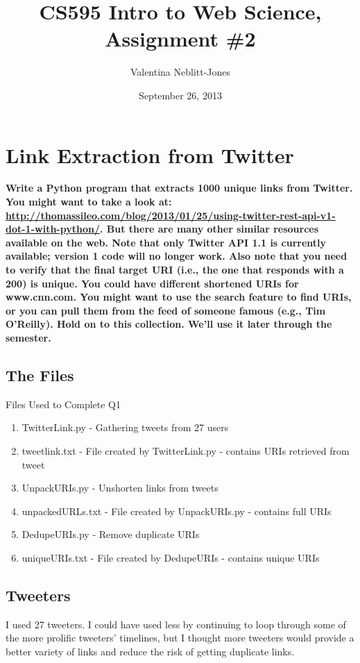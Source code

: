 \documentclass{article}
\begin{document}
\title{CS595 Intro to Web Science, Assignment \#2}
\author{Valentina Neblitt-Jones}
\date{September 26, 2013}
\maketitle

\section{Link Extraction from Twitter}
\textbf {Write a Python program that extracts 1000 unique links from Twitter. You might want to take a look at: \url{http://thomassileo.com/blog/2013/01/25/using-twitter-rest-api-v1-dot-1-with-python/}. But there are many other similar resources available on the web. Note that only Twitter API 1.1 is currently available; version 1 code will no longer work. Also note that you need to verify that the final target URI (i.e., the one that responds with a 200) is unique. You could have different shortened URIs for www.cnn.com. You might want to use the search feature to find URIs, or you can pull them from the feed of someone famous (e.g., Tim O'Reilly). Hold on to this collection. We'll use it later through the semester.}


\subsection*{The Files}
Files Used to Complete Q1

\begin{enumerate}
\item TwitterLink.py - Gathering tweets from 27 users
\item tweetlink.txt - File created by TwitterLink.py - contains URIs retrieved from tweet
\item UnpackURIs.py - Unshorten links from tweets
\item unpackedURLs.txt - File created by UnpackURIs.py - contains full URIs
\item DedupeURIs.py - Remove duplicate URIs
\item uniqueURIs.txt - File created by DedupeURIs - contains unique URIs
\end{enumerate}

\subsection*{Tweeters}
I used 27 tweeters. I could have used less by continuing to loop through some of the more prolific tweeters' timelines, but I thought more tweeters would provide a better variety of links and reduce the risk of getting duplicate links.
\end{document}
